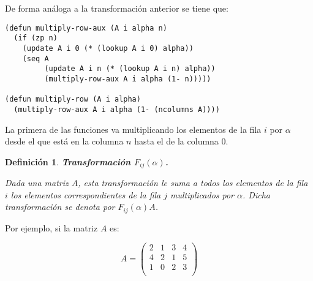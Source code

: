 \documentclass[a4paper,10pt]{article}
\newtheorem{defi}{{Definición}}
\begin{document}
\par \vspace{10pt}

De forma análoga a la transformación anterior se tiene que:

\par \vspace{10pt}

\begin{lstlisting}[language=clips]
(defun multiply-row-aux (A i alpha n)
  (if (zp n)
    (update A i 0 (* (lookup A i 0) alpha))
    (seq A
         (update A i n (* (lookup A i n) alpha))
         (multiply-row-aux A i alpha (1- n)))))
       
(defun multiply-row (A i alpha)
  (multiply-row-aux A i alpha (1- (ncolumns A))))
\end{lstlisting}

\par \vspace{10pt}

La primera de las funciones va multiplicando los elementos de la fila $i$ por $\alpha$ desde el que está en la columna $n$ hasta el de la columna 0. 

\par \vspace{12pt}

\begin{defi} \textbf{Transformación $F_{ij}(\alpha)$.}\vspace{8pt}\par
Dada una matriz $A$, esta transformación le suma a todos los elementos de la fila $i$ los elementos correspondientes de la fila $j$ multiplicados por $\alpha$. Dicha transformación se denota por $F_{ij}(\alpha)A$.
\end{defi}

\par \vspace{10pt}

Por ejemplo, si la matriz $A$ es:

\par \vspace{10pt}

$$
A=
\begin{pmatrix}
2 & 1 & 3 & 4 \\
4 & 2 & 1 & 5 \\
1 & 0 & 2 & 3 \\ 
\end{pmatrix}
$$ 

\par \vspace{10pt}
\end{document}
